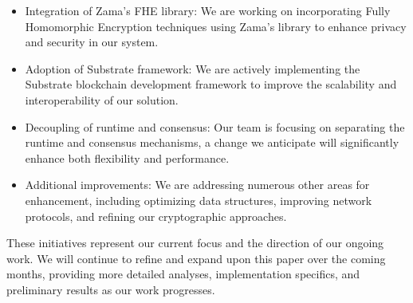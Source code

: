 \documentclass[11pt]{article}
\begin{document}
\begin{itemize}
  \item Integration of Zama\cite{TFHE-rs}'s FHE library: We are working on incorporating Fully Homomorphic Encryption techniques using Zama's library to enhance privacy and security in our system.
  \item Adoption of Substrate framework: We are actively implementing the Substrate blockchain development framework to improve the scalability and interoperability of our solution.
  \item Decoupling of runtime and consensus: Our team is focusing on separating the runtime and consensus mechanisms, a change we anticipate will significantly enhance both flexibility and performance.
  \item Additional improvements: We are addressing numerous other areas for enhancement, including optimizing data structures, improving network protocols, and refining our cryptographic approaches.
\end{itemize}
These initiatives represent our current focus and the direction of our ongoing work. We will continue to refine and expand upon this paper over the coming months, providing more detailed analyses, implementation specifics, and preliminary results as our work progresses. 





\end{document}

